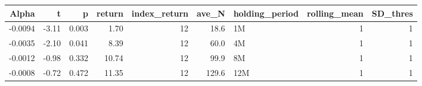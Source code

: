 \begin{table}[ht]
\centering
\begin{tabular}{rrrrrrlrr}
  \hline
Alpha & t & p & return & index\_return & ave\_N & holding\_period & rolling\_mean & SD\_thres \\ 
  \hline
-0.0094 & -3.11 & 0.003 & 1.70 & 12 & 18.6 & 1M &  1 &  1 \\ 
  -0.0035 & -2.10 & 0.041 & 8.39 & 12 & 60.0 & 4M &  1 &  1 \\ 
  -0.0012 & -0.98 & 0.332 & 10.74 & 12 & 99.9 & 8M &  1 &  1 \\ 
  -0.0008 & -0.72 & 0.472 & 11.35 & 12 & 129.6 & 12M &  1 &  1 \\ 
   \hline
\end{tabular}
\end{table}

